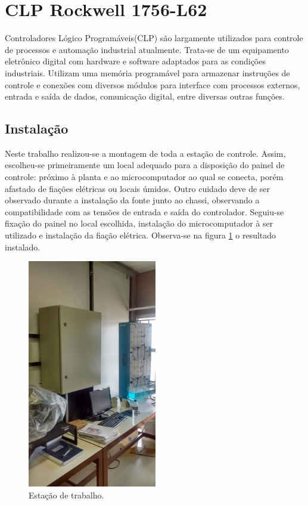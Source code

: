 \section{CLP Rockwell 1756-L62}
Controladores Lógico Programáveis(CLP) são largamente utilizados para controle de processos e automação industrial atualmente. Trata-se de um equipamento eletrônico digital com hardware e software adaptados para as condições industriais. Utilizam uma memória programável para armazenar instruções de controle e conexões com diversos módulos para interface com processos externos, entrada e saída de dados, comunicação digital, entre diversas outras funções.

\subsection{Instalação}
Neste trabalho realizou-se a montagem de toda a estação de controle. Assim, escolheu-se primeiramente um local adequado para a disposição do painel de controle: próximo à planta e ao microcomputador ao qual se conecta, porém afastado de fiações elétricas ou locais úmidos. Outro cuidado deve de ser observado durante a instalação da fonte junto ao chassi, observando a compatibilidade com as tensões de entrada e saída do controlador. Seguiu-se fixação do painel no local escolhida, instalação do microcomputador à ser utilizado e instalação da fiação elétrica. Observa-se na figura \ref{fig:mesa} o resultado instalado.

\begin{figure}[H]
	\centering
	\includegraphics[height=10cm,keepaspectratio]{figs/mesa.jpg}
	\caption{Estação de trabalho.}
	\label{fig:mesa}
\end{figure}


